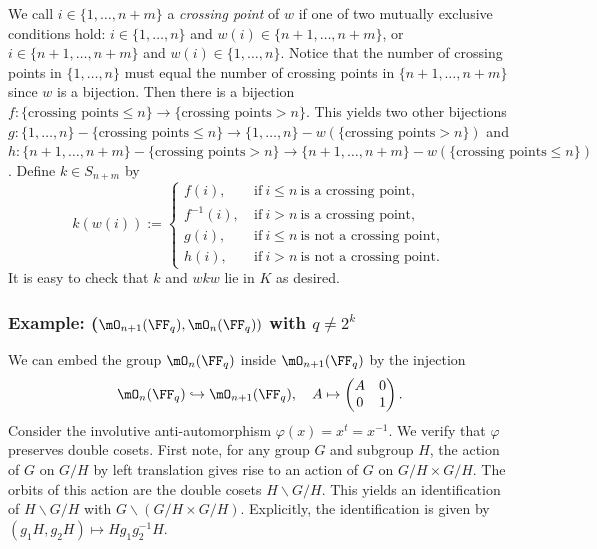 \documentclass[11pt]{amsart}
\theoremstyle{remark}
\begin{document}
We call $i\in\{1,\ldots,n+m\}$ a \emph{crossing point} of $w$ if one of two mutually exclusive conditions hold: $i\in\{1,\ldots,n\}$ and $w(i)\in\{n+1,\ldots,n+m\}$, or $i\in\{n+1,\ldots,n+m\}$ and $w(i)\in\{1,\ldots,n\}$.
Notice that the number of crossing points in $\{1,\ldots,n\}$ must equal the number of crossing points in $\{n+1,\ldots,n+m\}$ since $w$ is a bijection.
Then there is a bijection $f\colon \{\text{crossing points}\leq n\} \to \{\text{crossing points}>n\}$.
This yields two other bijections $g\colon \{1,\ldots,n\}-\{\text{crossing points}\leq n\} \to \{1,\ldots,n\}-w(\{\text{crossing points}>n\})$ and $h\colon \{n+1,\ldots,n+m\}-\{\text{crossing points}>n\} \to \{n+1,\ldots,n+m\} - w(\{\text{crossing points}\leq n\})$. Define $k\in S_{n+m}$ by
\[
	k(w(i)) := \begin{cases}
		f(i),\       & \text{if}\ i\leq n\ \text{is a crossing point},     \\
		f^{-1}(i),\  & \text{if}\ i>n\ \text{is a crossing point},         \\
		g(i),\       & \text{if}\ i\leq n\ \text{is not a crossing point}, \\
		h(i),\       & \text{if}\ i> n\ \text{is not a crossing point}.
	\end{cases}
\]
It is easy to check that $k$ and $wkw$ lie in $K$ as desired.

\subsubsection{Example: ($\mO_{n+1}(\FF_q),\mO_n(\FF_q))$ with $q\neq 2^k$}
We can embed the group $\mO_n(\FF_q)$ inside $\mO_{n+1}(\FF_q)$ by the injection
\[
	\mO_n(\FF_q) \hookrightarrow \mO_{n+1}(\FF_q),\quad A \mapsto \begin{pmatrix} A & 0 \\ 0 & 1 \end{pmatrix}.
\]
Consider the involutive anti-automorphism $\varphi(x)=x^t=x^{-1}$.
We verify that $\varphi$ preserves double cosets.
First note, for any group $G$ and subgroup $H$, the action of $G$ on $G/H$ by left translation gives rise to an action of $G$ on $G/H\times G/H$.
The orbits of this action are the double cosets $H\backslash G/H$.
This yields an identification of $H\backslash G/H$ with $G\backslash (G/H\times G/H)$.
Explicitly, the identification is given by $(g_1H,g_2H)\mapsto Hg_1g_2^{-1}H$.
\end{document}
